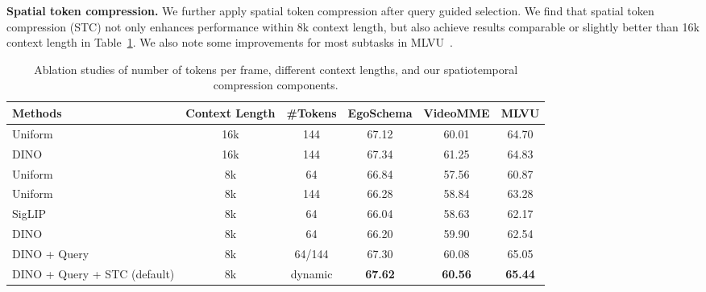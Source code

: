 \noindent\textbf{Spatial token compression.} We further apply spatial token compression after query guided selection. We find that spatial token compression (STC) not only enhances performance within 8k context length, but also achieve results comparable or slightly better than 16k context length in Table~\ref{tab:ablation}. We also note some improvements for most subtasks in MLVU~\citep{zhou2024mlvu}. 

\begin{table}[!htbp]
    \centering
\begin{adjustbox}{width=0.9\linewidth,center}
\renewcommand{\arraystretch}{1.2}
\setlength{\tabcolsep}{1.5mm}
\begin{tabular}{lccccc}
\toprule \textbf{Methods} & \textbf{Context Length} & \textbf{\#Tokens} & \multicolumn{1}{c}{ \textbf{EgoSchema} } & \multicolumn{1}{c}{ \textbf{VideoMME} } & \multicolumn{1}{c}{\textbf{MLVU}} \\
\midrule
\rowcolor{gray!10} Uniform & 16k & 144 & 67.12	& 60.01 & 64.70 \\
\rowcolor{gray!10} DINO & 16k & 144 & 67.34 & 61.25 & 64.83 \\
\midrule
Uniform & 8k & 64 & 66.84 & 57.56 & 60.87 \\
Uniform & 8k & 144 & 66.28 & 58.84 & 63.28 \\
\midrule
SigLIP & 8k & 64 & 66.04 & 58.63	& 62.17 \\
DINO & 8k & 64 & 66.20 & 59.90 & 62.54 \\
DINO + Query & 8k & 64/144 & 67.30 & 60.08 & 65.05 \\
\rowcolor{blue!10} DINO + Query + STC (default) & 8k & dynamic & \textbf{67.62} & \textbf{60.56} & \textbf{65.44} \\
\bottomrule
\end{tabular}
\end{adjustbox}
\caption{Ablation studies of number of tokens per frame, different context lengths, and our spatiotemporal compression components.}
\label{tab:ablation}
\end{table}

